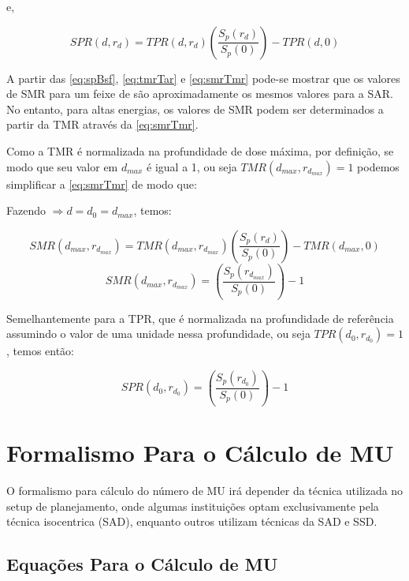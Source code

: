 \documentclass[11pt,a4paper]{article}
\begin{document}
    e,

        \begin{equation}
            SPR (d,r_d) = TPR(d,r_d) \left(\frac{S_p(r_d)}{S_p(0)}\right) - TPR(d,0)
            \label{eq:sprTpr}
        \end{equation}

        A partir das \ref{eq:spBsf}, \ref{eq:tmrTar} e \ref{eq:smrTmr} pode-se mostrar que os valores de SMR para um feixe de  são aproximadamente os mesmos valores para a SAR. No entanto, para altas energias, os valores de SMR  podem ser determinados a partir da TMR através da \ref{eq:smrTmr}.

        Como a TMR é normalizada na profundidade de dose máxima, por definição, se modo que seu valor em $d_{max}$ é igual a 1, ou seja $TMR(d_{max}, r_{d_{max}}) = 1$ podemos simplificar a \ref{eq:smrTmr} de modo que:

            Fazendo $\Rightarrow d = d_0 = d_{max}$, temos:

            $$
                SMR(d_{max}, r_{d_{max}}) = TMR(d_{max}, r_{d_{max}}) \left(\frac{S_p(r_d)}{S_p(0)}\right) - TMR(d_{max},0)
            $$    
            \begin{equation}
                SMR(d_{max}, r_{d_{max}}) = \left(\frac{S_p(r_{d_{max}})}{S_p(0)}\right) - 1
                \label{eq:smrSp}
            \end{equation}

        Semelhantemente para a TPR, que é normalizada na profundidade de referência assumindo o valor de uma unidade nessa profundidade, ou seja $TPR(d_0,r_{d_0}) = 1$, temos então:

        \begin{equation}
            SPR(d_{0}, r_{d_{0}}) = \left(\frac{S_p(r_{d_0})}{S_p(0)}\right) - 1
            \label{eq:sprSp}
        \end{equation}


    \section{Formalismo Para o Cálculo de MU}

        O formalismo para cálculo do número de MU irá depender da técnica utilizada no setup de planejamento, onde algumas instituições optam exclusivamente pela técnica isocentrica (SAD), enquanto outros utilizam técnicas da SAD e SSD.

    \subsection*{Equações Para o Cálculo de MU}
\end{document}
